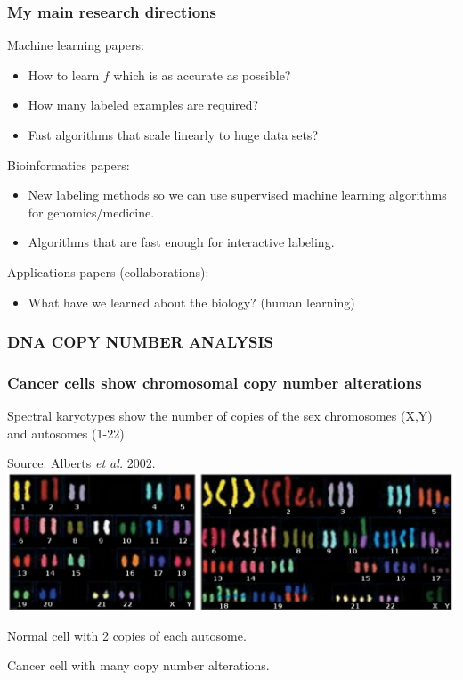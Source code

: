 \documentclass{beamer}
\begin{document}
\begin{frame}
  \frametitle{My main research directions}
  Machine learning papers:
  \begin{itemize}
  \item How to learn $f$ which is as accurate as possible?
  \item How many labeled examples are required?
  \item Fast algorithms that scale linearly to huge data sets?
  \end{itemize}
  Bioinformatics papers:
  \begin{itemize}
  \item New labeling methods so we can use supervised machine learning
    algorithms for genomics/medicine.
  \item Algorithms that are fast enough for interactive labeling.
  \end{itemize}
  Applications papers (collaborations):
  \begin{itemize}
  \item What have we learned about the biology? (human learning)
  \end{itemize}
\end{frame}

\begin{frame}
  \frametitle{DNA COPY NUMBER ANALYSIS}
\end{frame}

\begin{frame}
  \frametitle{Cancer cells show chromosomal copy number alterations}
  Spectral karyotypes show the number of copies of the sex chromosomes
  (X,Y) and autosomes (1-22). 

  Source: Alberts \emph{et al.} 2002.
\vskip 0.1in
  \includegraphics[width=\textwidth]{Karyo-both}
\vskip 0.1in
  \begin{minipage}{0.4\linewidth}
    Normal cell with 2 copies of each autosome.
  \end{minipage}
\linewidth
  \begin{minipage}{0.4\linewidth}
Cancer cell with many copy number alterations.
  \end{minipage}
\end{frame}
\end{document}
